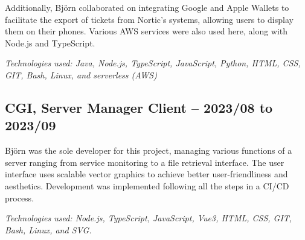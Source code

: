 \documentclass{article}
\begin{document}
\begin{minipage}[t]{0.7\textwidth}
		Additionally, Björn collaborated on integrating Google and Apple Wallets to facilitate the export of tickets from Nortic's systems, allowing users to display them on their phones. Various AWS services were also used here, along with Node.js and TypeScript.
		
		\vspace{5pt}\textit{Technologies used: Java, Node.js, TypeScript, JavaScript, Python, HTML, CSS, GIT, Bash, Linux, and serverless (AWS)}
		
		\vspace{15pt} %
		\subsection*{\textcolor{colorTitelErfarenhet}{CGI, Server Manager Client – 2023/08 to 2023/09}}
		Björn was the sole developer for this project, managing various functions of a server ranging from service monitoring to a file retrieval interface. The user interface uses scalable vector graphics to achieve better user-friendliness and aesthetics. Development was implemented following all the steps in a CI/CD process.
		
		\vspace{5pt}\textit{Technologies used: Node.js, TypeScript, JavaScript, Vue3, HTML, CSS, GIT, Bash, Linux, and SVG.}
		
	\end{minipage}%
	\hfill
\end{document}
